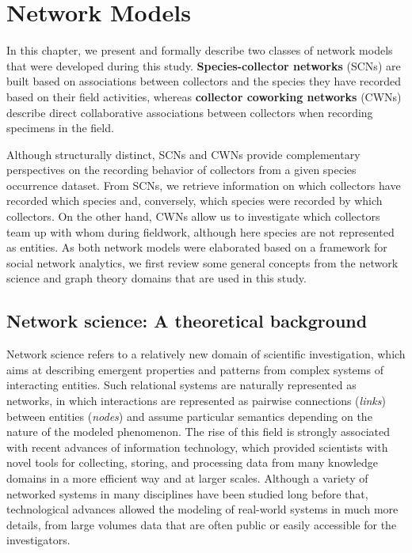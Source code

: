 \chapter{Network Models}\label{chapter:network_models}


In this chapter, we present and formally describe two classes of network models that were developed during this study.
\textbf{Species-collector networks} (SCNs) are built based on associations between collectors and the species they have recorded based on their field activities, whereas \textbf{collector coworking networks} (CWNs) describe direct collaborative associations between collectors when recording specimens in the field.

Although structurally distinct, SCNs and CWNs provide complementary perspectives on the recording behavior of collectors from a given species occurrence dataset. 
From SCNs, we retrieve information on which collectors have recorded which species and, conversely, which species were recorded by which collectors. 
On the other hand, CWNs allow us to investigate which collectors team up with whom during fieldwork, although here species are not represented as entities.
As both network models were elaborated based on a framework for social network analytics, we first review some general concepts from the network science and graph theory domains that are used in this study.


\section{Network science: A theoretical background}

Network science refers to a relatively new domain of scientific investigation, which aims at describing emergent properties and patterns from complex systems of interacting entities.
Such relational systems are naturally represented as networks, in which interactions are represented as pairwise connections (\textit{links}) between entities (\textit{nodes}) and assume particular semantics depending on the nature of the modeled phenomenon.
The rise of this field is strongly associated with recent advances of information technology, which provided scientists with novel tools for collecting, storing, and processing data from many knowledge domains in a more efficient way and at larger scales.
Although a variety of networked systems in many disciplines have been studied long before that, technological advances allowed the modeling of real-world systems in much more details, from large volumes data that are often public or easily accessible for the investigators.


